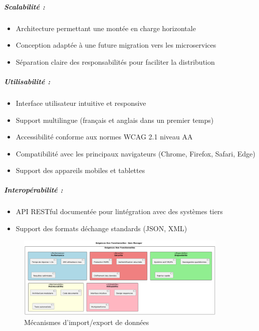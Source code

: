 \documentclass[12pt,a4paper,twoside,openright]{report}
\begin{document}
\hypertarget{scalabilituxe9}{%
\subparagraph{Scalabilité :}\label{scalabilituxe9}}

\begin{itemize}
\item
  Architecture permettant une montée en charge horizontale
\item
  Conception adaptée à une future migration vers les microservices
\item
  Séparation claire des responsabilités pour faciliter la distribution
\end{itemize}

\hypertarget{utilisabilituxe9}{%
\subparagraph{Utilisabilité :}\label{utilisabilituxe9}}

\begin{itemize}
\item
  Interface utilisateur intuitive et responsive
\item
  Support multilingue (français et anglais dans un premier temps)
\item
  Accessibilité conforme aux normes WCAG 2.1 niveau AA
\item
  Compatibilité avec les principaux navigateurs (Chrome, Firefox,
  Safari, Edge)
\item
  Support des appareils mobiles et tablettes
\end{itemize}

\hypertarget{interopuxe9rabilituxe9}{%
\subparagraph{Interopérabilité :}\label{interopuxe9rabilituxe9}}

\begin{itemize}
\item
  API RESTful documentée pour l\textquotesingle intégration avec des
  systèmes tiers
\item
  Support des formats d\textquotesingle échange standards (JSON, XML)
\end{itemize}

\begin{figure}[H]
\centering
\includegraphics[width=0.9\textwidth]{latex_media/media/image12.png}
\caption{Mécanismes d'import/export de données}
\label{fig:import-export-donnees}
\end{figure}
\end{document}
